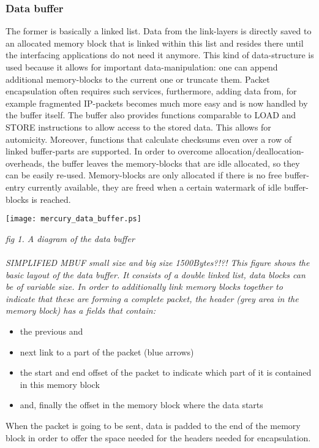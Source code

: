 \documentclass[11pt,a4paper]{article}
\begin{document}
\subsubsection{Data buffer}The former is basically a linked list. Data from the link-layers is directly saved to an allocated memory block that is linked within this list and resides there until the interfacing applications do not need it anymore. This kind of data-structure is used because it allows for important data-manipulation: one can append additional memory-blocks to the current one or truncate them. Packet encapsulation often requires such services, furthermore, adding data from, for example fragmented IP-packets becomes much more easy and is now handled by the buffer itself. The buffer also provides functions comparable to LOAD and STORE instructions to allow access to the stored data. This allows for automicity. Moreover, functions that calculate checksums even over a row of linked buffer-parts are supported. In order to overcome allocation/deallocation-overheads, the buffer leaves the memory-blocks that are idle allocated, so they can be easily re-used. Memory-blocks are only allocated if there is no free buffer-entry currently available, they are freed when a certain watermark of idle buffer-blocks is reached.
\\
\begin{center}

\texttt{[image: mercury\_data\_buffer.ps]}
\end{center}
\sl fig 1. A diagram of the data buffer 
\\\\
SIMPLIFIED MBUF
small size and big size 1500Bytes?!?!
\rm
This figure shows the basic layout of the data buffer. It consists of a double linked list, data blocks can be of
variable size. In order to additionally link memory blocks together to indicate that these are forming a complete packet, the header (grey area in the memory block) has a fields that contain:
\begin{itemize}
\item the previous and 
\item next link to a part of the packet (blue arrows)
\item the start and end offset of the packet to indicate which part of it is contained in this memory block
\item and, finally the offset in the memory block where the data starts
\end{itemize}
When the packet is going to be sent, data is padded to the end of the memory block in order to offer the space needed
for the headers needed for encapsulation.
\end{document}
